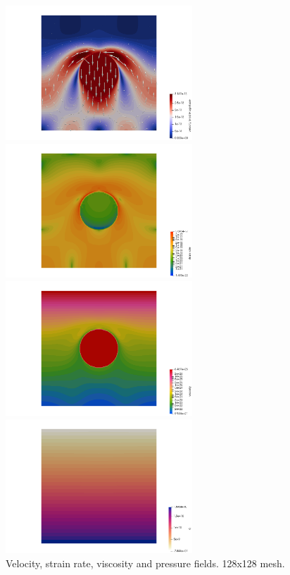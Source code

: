 \begin{center}
\includegraphics[width=7cm]{python_codes/fieldstone_87/results/experiment_06/vel.png}
\includegraphics[width=7cm]{python_codes/fieldstone_87/results/experiment_06/sr.png}\\
\includegraphics[width=7cm]{python_codes/fieldstone_87/results/experiment_06/eta.png}
\includegraphics[width=7cm]{python_codes/fieldstone_87/results/experiment_06/p.png}\\
{\captionfont Velocity, strain rate, viscosity and pressure fields. 128x128 mesh.}
\end{center}

